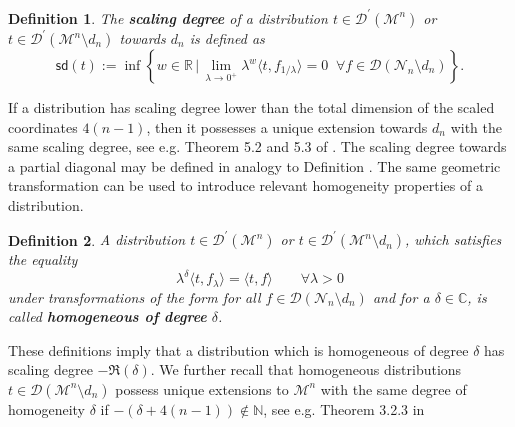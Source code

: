 \documentclass[10pt]{book}
\newcommand{\sd}{\mathsf{sd}}
\newcommand{\Dcal}{\mathcal{D}}
\newcommand{\Mcal}{\mathcal{M}}
\newcommand{\Ncal}{\mathcal{N}}
\theoremstyle{break}
\newtheorem{definition}{Definition}
\begin{document}
\begin{definition}
The {\bf scaling degree} of a distribution $t\in \Dcal^\prime(\Mcal^n)$ or $t\in \Dcal^\prime(\Mcal^n\setminus d_n)$ towards $d_n$ 
is defined as 
\[
\sd(t) := \inf\left \{w \in \mathbb{R}\,\big|\, \lim_{\lambda \to 0^+}\lambda^{w} \langle t,f_{1/\lambda} \rangle  = 0\;\;\forall f\in\Dcal(\Ncal_n\setminus d_n) \right\}.
\] 
\end{definition}

If a distribution has scaling degree lower than the total dimension of the scaled coordinates $4(n-1)$, then it possesses a unique extension towards $d_n$ with the same scaling degree, see e.g. Theorem 5.2 and 5.3 of %
. The scaling degree towards a partial diagonal may be defined in analogy to Definition %
. The same geometric transformation %
can be used to introduce relevant homogeneity properties of a distribution.

\begin{definition}
A distribution $t\in \Dcal^\prime(\Mcal^n)$ or $t\in \Dcal^\prime(\Mcal^n\setminus d_n)$, which satisfies the equality 
\[
\lambda^{\delta} \langle t,f_\lambda \rangle    = \langle t,f \rangle \qquad\forall \lambda >0
\]
under transformations of the form %
for all $f\in\Dcal(\Ncal_n\setminus d_n)$ and for a $\delta\in\mathbb{C}$, is called {\bf homogeneous of degree} $\delta$. 
\end{definition}

These definitions imply that a distribution which is homogeneous of degree $\delta$ has scaling degree $-\Re(\delta)$. We further recall that homogeneous distributions $t\in\Dcal(\Mcal^n\setminus d_n)$ possess unique extensions to $\Mcal^n$ with the same degree of homogeneity $\delta$ if $-(\delta+4(n-1))\notin \mathbb{N}$, see e.g. Theorem 3.2.3 in %
\end{document}
